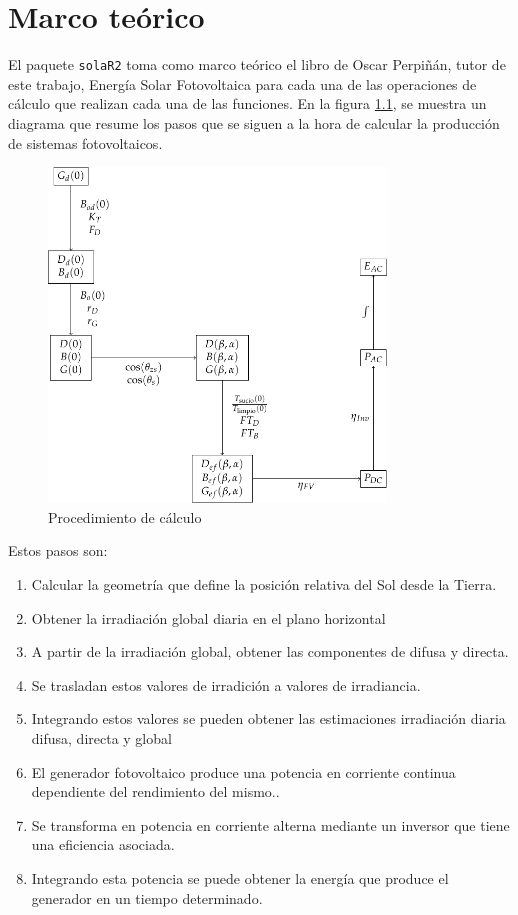 \chapter{Marco teórico}
\label{chap:marco-teorico}
El paquete \texttt{solaR2} toma como marco teórico el libro de Oscar Perpiñán, tutor de este trabajo, Energía Solar Fotovoltaica \cite{Perpinan2023} para cada una de las operaciones de cálculo que realizan cada una de las funciones.
En la figura \ref{fig:org7830cd3}, se muestra un diagrama que resume los pasos que se siguen a la hora de calcular la producción de sistemas fotovoltaicos.
\begin{figure}[]
\centering
\includegraphics[keepaspectratio,width=0.8\textwidth,height=0.5\textheight]{figuras/ProcedimientoCalculoRadiacionInclinada.pdf}
\caption{\label{fig:org7830cd3}Procedimiento de cálculo}
\end{figure}
Estos pasos son:
\begin{enumerate}
\item Calcular la geometría que define la posición relativa del Sol desde la Tierra.
\item Obtener la irradiación global diaria en el plano horizontal
\item A partir de la irradiación global, obtener las componentes de difusa y directa.
\item Se trasladan estos valores de irradición a valores de irradiancia.
\item Integrando estos valores se pueden obtener las estimaciones irradiación diaria difusa, directa y global
\item El generador fotovoltaico produce una potencia en corriente continua dependiente del rendimiento del mismo..
\item Se transforma en potencia en corriente alterna mediante un inversor que tiene una eficiencia asociada.
\item Integrando esta potencia se puede obtener la energía que produce el generador en un tiempo determinado.
\end{enumerate}

